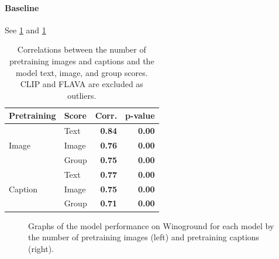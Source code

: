 \paragraph{Baseline}

See \cref{tab:data-size-correlations-baseline} and \cref{fig:pretraining_images_baseline}

\begin{table}[ht]
\centering
\begin{tabular}{llrr}
\toprule
Pretraining & Score & Corr. & p-value\\\midrule
 & Text & \textbf{0.84} & \textbf{0.00} \\
 Image & Image & \textbf{0.76} & \textbf{0.00} \\
 & Group & \textbf{0.75} & \textbf{0.00} \\\midrule
 & Text  & \textbf{0.77} & \textbf{0.00} \\
 Caption & Image & \textbf{0.75} & \textbf{0.00} \\
 & Group & \textbf{0.71} & \textbf{0.00} \\
\bottomrule
\end{tabular}
\caption{Correlations between the number of pretraining images and captions and the model text, image, and group scores. CLIP and FLAVA are excluded as outliers.}
\label{tab:data-size-correlations-baseline}
\end{table}

\begin{figure}[ht]
    \centering
    \caption{Graphs of the model performance on Winoground for each model by the number of pretraining images (left) and pretraining captions (right).}
    \label{fig:pretraining_images_baseline}
\end{figure}

